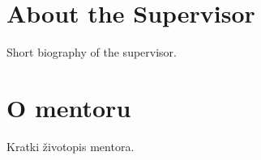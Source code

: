\thispagestyle{empty}

\section*{About the Supervisor}


Short biography of the supervisor.


\section*{O mentoru}


Kratki životopis mentora.
